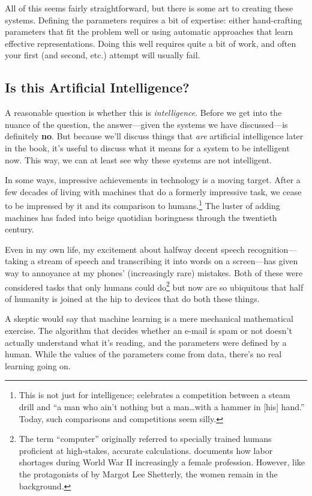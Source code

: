 All of this seems fairly straightforward, but there is some art to
creating these systems.  Defining the parameters requires a bit of
expertise: either hand-crafting parameters that fit the problem well
or using automatic approaches that learn effective representations.
Doing this well requires quite a bit of work, and often your first
(and second, etc.) attempt will usually fail.

\subsection{Is this Artificial Intelligence?}

A reasonable question is whether this is \emph{intelligence}.  Before
we get into the nuance of the question, the answer---given the systems
we have discussed---is definitely \textbf{no}.  But because we'll
discuss things that \emph{are} artificial intelligence later in the
book, it's useful to discuss what it means for a system to be
intelligent now.  This way, we can at least see why these systems are
not intelligent.

In some ways, impressive achievements in technology is a moving
target.  After a few decades of living with machines that do a
formerly impressive task, we cease to be impressed by it and its
comparison to humans.\footnote{This is not just for intelligence;
   celebrates a competition between a
  steam drill and ``a man who ain't nothing but a man\dots with a
  hammer in [his] hand.''  Today, such comparisons and competitions
  seem silly.}  The luster of adding machines has faded into beige
quotidian boringness through the twentieth century.

Even in my own life, my excitement about halfway decent speech
recognition---taking a stream of speech and transcribing it into words
on a screen---has given way to annoyance at my phones' (increasingly
rare) mistakes.  Both of these were considered tasks that only humans
could do\footnote{The term ``computer'' originally referred to
  specially trained humans proficient at high-stakes, accurate
  calculations.  \citet{light-99} documents how labor shortages during
World War II increasingly a female profession.  However, like the
protagonists of  by Margot Lee Shetterly, the
women remain in the background.} but now are so ubiquitous that half of humanity is
joined at the hip to devices that do both these things.

A skeptic would say that machine learning is a mere mechanical
mathematical exercise.  The algorithm that decides whether an e-mail
is spam or not doesn't actually understand what it's reading, and the
parameters were defined by a human.  While the values of the
parameters come from data, there's no real learning going on.

